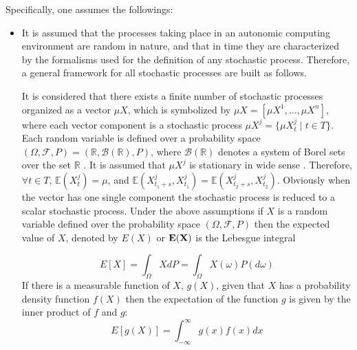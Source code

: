 Specifically, one assumes the followings:

\begin{itemize}
\item It is assumed that the processes taking place in an autonomic computing environment are random in nature, and that in time they are characterized by the formalisms used for the definition of any stochastic process. Therefore, a general framework for all stochastic processes are built as follows. 

It is considered that there exists a finite number of stochastic processes organized as a vector $\mu X$, which is  symbolized by $\mu X = [\mu X^1,...,\mu X^n]$, where each vector component is a stochastic process $\mu X^j = \{ \mu X^j_t \mid  t \in T\}$. Each random variable is defined over a probability space $(\Omega, \mathcal{F}, P) = (\mathbb{R}, \mathcal{B}(\mathbb{R}), P)$, where $\mathcal{B}(\mathbb{R})$ denotes a system of Borel sets over the set $\mathbb{R}$ .
It is assumed that $\mu X^j$ is stationary in wide sense \cite{shiryaev1995probability}. Therefore, $\forall t \in T$, $\mathbb{E}(X^j_t) = \mu$, and $\mathbb{E}(X^j_{t_1+s}, X^j_{t_1}) = \mathbb{E}(X^j_{t_2 + s}, X^j_{t_2})$.
Obviously when the vector has one single component the stochastic process is reduced to a scalar stochastic process.
Under the above assumptions if $X$ is a random variable defined over the probability space  $(\Omega, \mathcal{F}, P)$ then the expected value of $X$, denoted by $E(X)$ or $\bf{E}(X)$ is the Lebesgue integral

\begin{equation}
E\left[X\right]= \int_{\Omega} XdP= \int_{\Omega} X(\omega)P(d\omega)
 \label{eq:Expectation}
\end{equation}
If there is a measurable function of $X$, $g(X)$, given that $X$ has a probability density function $f(X)$ then the expectation of the function $g$ is given by the inner product of $f$ and $g$:
\begin{equation}
E\left[g(X)\right]= \int_{-\infty}^{\infty} g(x)f(x)dx
 \label{eq:Expectation1}
\end{equation}


\end{itemize}
